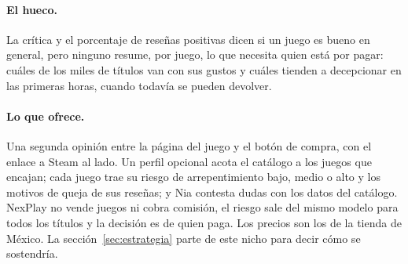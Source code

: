 \paragraph{El hueco.} La crítica y el porcentaje de reseñas positivas dicen si un juego es
bueno en general, pero ninguno resume, por juego, lo que necesita quien está por pagar: cuáles de los
miles de títulos van con sus gustos y cuáles tienden a decepcionar en las primeras horas, cuando
todavía se pueden devolver.

\paragraph{Lo que ofrece.} Una segunda opinión entre la página del juego y el botón de compra, con el
enlace a Steam al lado. Un perfil opcional acota el catálogo a los juegos que encajan; cada juego trae
su riesgo de arrepentimiento bajo, medio o alto y los motivos de queja de sus reseñas; y Nia contesta
dudas con los datos del catálogo. NexPlay no vende juegos ni cobra comisión, el riesgo sale del mismo
modelo para todos los títulos y la decisión es de quien paga. Los precios son los de la tienda de
México. La sección~\ref{sec:estrategia} parte de este nicho para decir cómo se sostendría.
